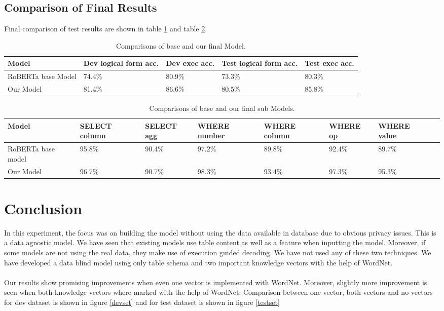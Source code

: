 \documentclass[12pt]{article}
\begin{document}
\subsection{Comparison of Final Results}
Final comparison of test results are shown in table \ref{finalcomparisonmodel} and table \ref{finalcomparison}.


 \begin{table}
\centering
 \begin{tabular}{| m{2cm} | m{2cm}| m{2cm} |m{2cm}| m{2cm} |} 
 \hline
Model & Dev logical form acc. & Dev exec acc. & Test logical form acc. & Test exec acc. \\ 
 \hline\hline
   RoBERTa base Model & 74.4\% & 80.9\% & 73.3\% & 80.3\% \\ 
  Our Model & 81.4\% & 86.6\% & 80.5\% & 85.8\% \\ 
 \hline
\end{tabular}
\caption{Comparisons of base and our final Model.}
\label{finalcomparisonmodel}
\end{table}


\begin{table}
\centering
 \begin{tabular}{| m{2cm} | m{2cm}| m{2cm} |m{2cm}| m{2cm} |m{2cm} | m{2cm} |m{2cm} |} 
 \hline
  Model & SELECT column & SELECT agg & WHERE number & WHERE column & WHERE op & WHERE value\\ 
 \hline\hline
  RoBERTa base model & 95.8\% & 90.4\% & 97.2\% & 89.8\% & 92.4\% &  89.7\% \\ 
\hline
 Our Model &  96.7\% & 90.7\% & 98.3\% & 93.4\% & 97.3\% &  95.3\% \\ 
 \hline
\end{tabular}
\caption{Comparisons of base and our final sub Models.}
\label{finalcomparison}
\end{table}


\section{Conclusion}
In this experiment, the focus was on building the model without using the data available in database due to obvious privacy issues. This is a data agnostic model. We have seen that existing models use table content as well as a feature when inputting the model. Moreover, if some models are not using the real data, they make use of execution guided decoding. We have not used any of these two techniques. We have developed a data blind model using only table schema and two important knowledge vectors with the help of WordNet. 
\\
\\
Our results show promising improvements when even one vector is implemented with WordNet. Moreover, slightly more improvement is seen when both knowledge vectors where marked with the help of WordNet. Comparison between one vector, both vectors and no vectors for dev dataset is shown in figure \ref{devset} and for test dataset is shown in figure \ref{testset}
\end{document}
